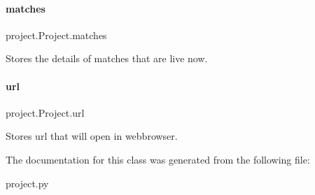 \paragraph{\texorpdfstring{matches}{matches}}
{\footnotesize\ttfamily project.\+Project.\+matches}



Stores the details of matches that are live now. 

\mbox{\label{classproject_1_1Project_a01795b2bb34021c1beccf62211d1383b}} 
\paragraph{\texorpdfstring{url}{url}}
{\footnotesize\ttfamily project.\+Project.\+url}



Stores url that will open in webbrowser. 



The documentation for this class was generated from the following file\+:\begin{DoxyCompactItemize}
\item 
project.\+py\end{DoxyCompactItemize}
